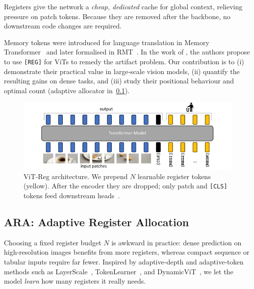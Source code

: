 \documentclass{article}
\newcommand{\RegTok}{\texttt{[REG]}\xspace}
\newcommand{\nreg}{N}
\newcommand{\citet}{\textcite}
\newcommand{\citep}{\parencite}
\newcommand{\OURS}{\textsc{ARA}\xspace}
\begin{document}
Registers give the network a \emph{cheap, dedicated} cache for global context, relieving pressure on patch tokens.  
Because they are removed after the backbone, no downstream code changes are required.

Memory tokens were introduced for language translation in Memory Transformer~\citep{burtsevMemoryTransformer2021} and later formalised in RMT~\citep{bulatovRecurrentMemoryTransformer2022}.
In the work of \citet{darcetVisionTransformersNeed2024}, the authors propose to use \RegTok for ViTs to remedy the artifact problem.
Our contribution is to (i) demonstrate their practical value in large‑scale vision models, (ii) quantify the resulting gains on dense tasks, and (iii) study their positional behaviour and optimal count (adaptive allocator in \cref{sec:adaptive}).

\begin{figure}[t]
  \centering
  \includegraphics{resources/model.pdf}
  \caption{
    ViT‑Reg architecture.  
    We prepend $\nreg$ learnable register tokens (yellow).  
    After the encoder they are dropped; only patch and \texttt{[CLS]} tokens feed downstream heads \citep{darcetVisionTransformersNeed2024}.
    }
  \vspace{-1em}
  \label{fig:model}
\end{figure}



\subsection{\OURS: Adaptive Register Allocation}
\label{sec:adaptive}

Choosing a fixed register budget $\nreg$ is awkward in practice: dense prediction on high‑resolution images benefits from more registers, whereas compact sequence or tabular inputs require far fewer.  
Inspired by adaptive‑depth and adaptive‑token methods such as LayerScale \citep{touvronGoingDeeperImage2021}, TokenLearner \citep{ryooTokenLearnerAdaptiveSpacetime2021}, and DynamicViT \citep{raoDynamicViTEfficientVision2021}, we let the model \emph{learn} how many registers it really needs.
\end{document}
